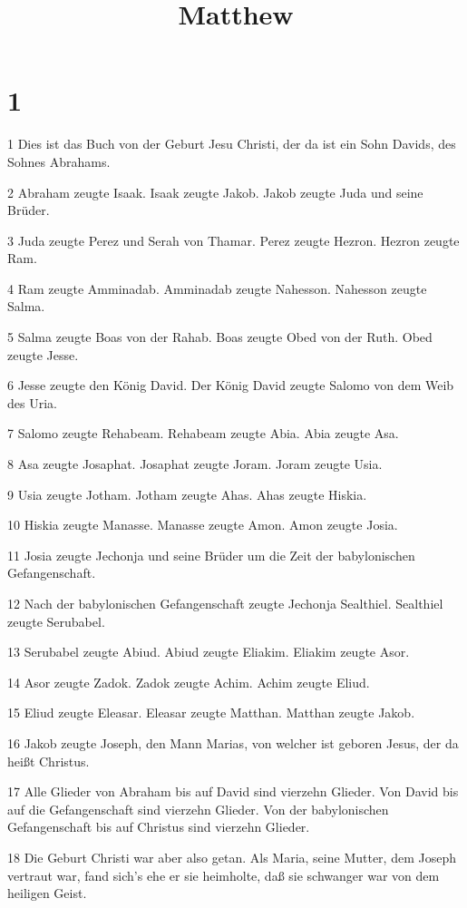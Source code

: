 

\title{Matthew}


\chapter{1}

\par 1 Dies ist das Buch von der Geburt Jesu Christi, der da ist ein Sohn Davids, des Sohnes Abrahams.
\par 2 Abraham zeugte Isaak. Isaak zeugte Jakob. Jakob zeugte Juda und seine Brüder.
\par 3 Juda zeugte Perez und Serah von Thamar. Perez zeugte Hezron. Hezron zeugte Ram.
\par 4 Ram zeugte Amminadab. Amminadab zeugte Nahesson. Nahesson zeugte Salma.
\par 5 Salma zeugte Boas von der Rahab. Boas zeugte Obed von der Ruth. Obed zeugte Jesse.
\par 6 Jesse zeugte den König David. Der König David zeugte Salomo von dem Weib des Uria.
\par 7 Salomo zeugte Rehabeam. Rehabeam zeugte Abia. Abia zeugte Asa.
\par 8 Asa zeugte Josaphat. Josaphat zeugte Joram. Joram zeugte Usia.
\par 9 Usia zeugte Jotham. Jotham zeugte Ahas. Ahas zeugte Hiskia.
\par 10 Hiskia zeugte Manasse. Manasse zeugte Amon. Amon zeugte Josia.
\par 11 Josia zeugte Jechonja und seine Brüder um die Zeit der babylonischen Gefangenschaft.
\par 12 Nach der babylonischen Gefangenschaft zeugte Jechonja Sealthiel. Sealthiel zeugte Serubabel.
\par 13 Serubabel zeugte Abiud. Abiud zeugte Eliakim. Eliakim zeugte Asor.
\par 14 Asor zeugte Zadok. Zadok zeugte Achim. Achim zeugte Eliud.
\par 15 Eliud zeugte Eleasar. Eleasar zeugte Matthan. Matthan zeugte Jakob.
\par 16 Jakob zeugte Joseph, den Mann Marias, von welcher ist geboren Jesus, der da heißt Christus.
\par 17 Alle Glieder von Abraham bis auf David sind vierzehn Glieder. Von David bis auf die Gefangenschaft sind vierzehn Glieder. Von der babylonischen Gefangenschaft bis auf Christus sind vierzehn Glieder.
\par 18 Die Geburt Christi war aber also getan. Als Maria, seine Mutter, dem Joseph vertraut war, fand sich's ehe er sie heimholte, daß sie schwanger war von dem heiligen Geist.
